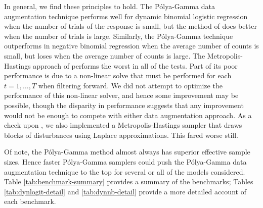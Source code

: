 \documentclass[11pt]{article}
\newcommand{\Polya}{P\'{o}lya}
\begin{document}
In general, we find these principles to hold.  The \Polya-Gamma data
augmentation technique performs well for dynamic binomial logistic regression
when the number of trials of the response is small, but the method of
\cite{fussl-etal-2013} does better when the number of trials is large.
Similarly, the \Polya-Gamma technique outperforms
\cite{fruhwirth-schnatter-etal-2009} in negative binomial regression when the
average number of counts is small, but loses when the average number of counts
is large.  The Metropolis-Hastings approach of \cite{ravines-etal-2006} performs
the worst in all of the tests.  Part of its poor performance is due to a
non-linear solve that must be performed for each $t=1, \ldots, T$ when filtering
forward.  We did not attempt to optimize the performance of this non-linear
solver, and hence some improvement may be possible, though the disparity in
performance suggests that any improvement would not be enough to compete with
either data augmentation approach.  As a check upon \cite{ravines-etal-2006}, we
also implemented a Metropolis-Hastings sampler that draws blocks of disturbances
using Laplace approximations.  This fared worse still. 

Of note, the \Polya-Gamma method almost always has superior effective sample
sizes.  Hence faster \Polya-Gamma samplers could push the \Polya-Gamma data
augmentation technique to the top for several or all of the models considered.
Table \ref{tab:benchmark-summary} provides a summary of the benchmarks; Tables
\ref{tab:dynlogit-detail} and \ref{tab:dynnb-detail} provide a more detailed
account of each benchmark.
\end{document}
